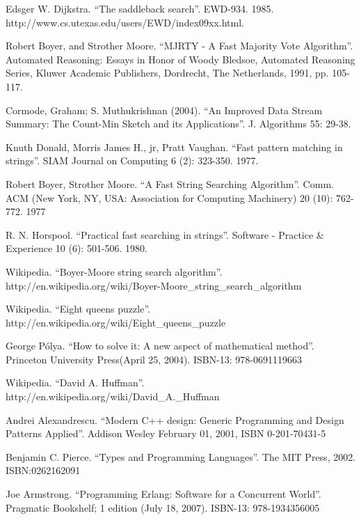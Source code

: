 \documentclass[UTF8]{article}
\begin{document}
\begin{thebibliography}{99}
Edsger W. Dijkstra. ``The saddleback search''. EWD-934. 1985. http://www.cs.utexas.edu/users/EWD/index09xx.html.

Robert Boyer, and Strother Moore. ``MJRTY - A Fast Majority Vote Algorithm''. Automated Reasoning: Essays in Honor of Woody Bledsoe, Automated Reasoning Series, Kluwer Academic Publishers, Dordrecht, The Netherlands, 1991, pp. 105-117.

Cormode, Graham; S. Muthukrishnan (2004). ``An Improved Data Stream Summary: The Count-Min Sketch and its Applications''. J. Algorithms 55: 29-38.

Knuth Donald, Morris James H., jr, Pratt Vaughan. ``Fast pattern matching in strings''. SIAM Journal on Computing 6 (2): 323-350. 1977.

Robert Boyer, Strother Moore. ``A Fast String Searching Algorithm''. Comm. ACM (New York, NY, USA: Association for Computing Machinery) 20 (10): 762-772. 1977

R. N. Horspool. ``Practical fast searching in strings''. Software - Practice \& Experience 10 (6): 501-506. 1980.

Wikipedia. ``Boyer-Moore string search algorithm''. http://en.wikipedia.org/wiki/Boyer-Moore\_string\_search\_algorithm

Wikipedia. ``Eight queens puzzle''. http://en.wikipedia.org/wiki/Eight\_queens\_puzzle

George P\'{o}lya. ``How to solve it: A new aspect of mathematical method''. Princeton University Press(April 25, 2004). ISBN-13: 978-0691119663

Wikipedia. ``David A. Huffman''. http://en.wikipedia.org/wiki/David\_A.\_Huffman


Andrei Alexandrescu. ``Modern C++ design: Generic Programming and Design Patterns Applied''. Addison Wesley February 01, 2001, ISBN 0-201-70431-5

Benjamin C. Pierce. ``Types and Programming Languages''. The MIT Press, 2002. ISBN:0262162091

Joe Armstrong. ``Programming Erlang: Software for a Concurrent World''. Pragmatic Bookshelf; 1 edition (July 18, 2007). ISBN-13: 978-1934356005


\end{thebibliography}
\end{document}
